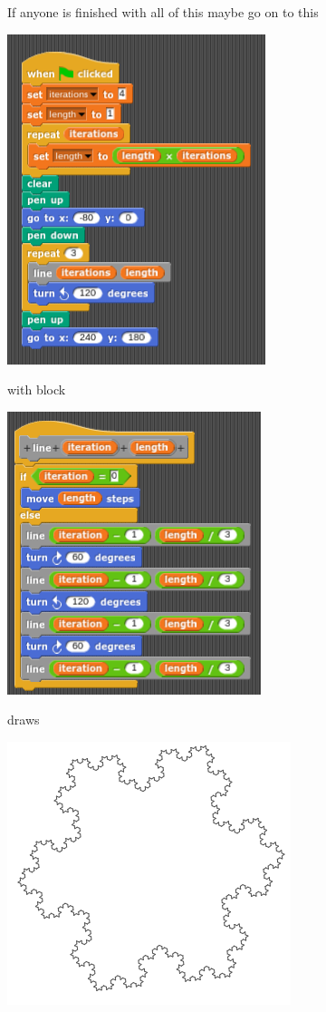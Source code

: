\documentclass[11pt,a4paper]{scrartcl}
\begin{document}
If anyone is finished with all of this maybe go on to this
\begin{center}
\includegraphics{koch.png}
\end{center}
with block
\begin{center}
\includegraphics{koch_block.png}
\end{center}
draws
\begin{center}
\includegraphics{koch_pic.png}
\end{center}
\end{document}
